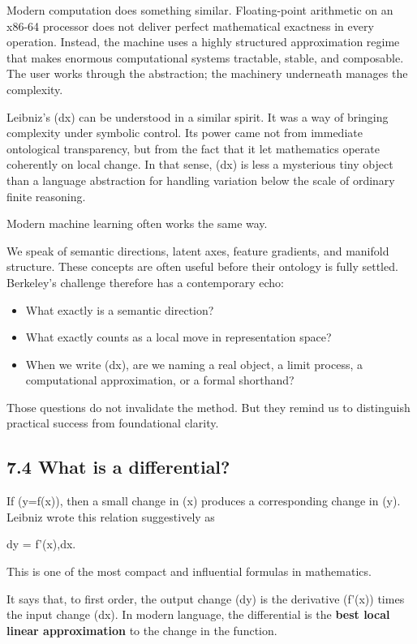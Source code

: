 \documentclass[
]{article}
\providecommand{\tightlist}{%
  \setlength{\itemsep}{0pt}\setlength{\parskip}{0pt}}
\begin{document}
Modern computation does something similar. Floating-point arithmetic on
an x86-64 processor does not deliver perfect mathematical exactness in
every operation. Instead, the machine uses a highly structured
approximation regime that makes enormous computational systems
tractable, stable, and composable. The user works through the
abstraction; the machinery underneath manages the complexity.

Leibniz's (dx) can be understood in a similar spirit. It was a way of
bringing complexity under symbolic control. Its power came not from
immediate ontological transparency, but from the fact that it let
mathematics operate coherently on local change. In that sense, (dx) is
less a mysterious tiny object than a language abstraction for handling
variation below the scale of ordinary finite reasoning.

Modern machine learning often works the same way.

We speak of semantic directions, latent axes, feature gradients, and
manifold structure. These concepts are often useful before their
ontology is fully settled. Berkeley's challenge therefore has a
contemporary echo:

\begin{itemize}
\tightlist
\item
  What exactly is a semantic direction?
\item
  What exactly counts as a local move in representation space?
\item
  When we write (dx), are we naming a real object, a limit process, a
  computational approximation, or a formal shorthand?
\end{itemize}

Those questions do not invalidate the method. But they remind us to
distinguish practical success from foundational clarity.

\hypertarget{what-is-a-differential}{%
\subsection{7.4 What is a differential?}\label{what-is-a-differential}}

If (y=f(x)), then a small change in (x) produces a corresponding change
in (y). Leibniz wrote this relation suggestively as

dy = f'(x),dx.

This is one of the most compact and influential formulas in mathematics.

It says that, to first order, the output change (dy) is the derivative
(f'(x)) times the input change (dx). In modern language, the
differential is the \textbf{best local linear approximation} to the
change in the function.
\end{document}
